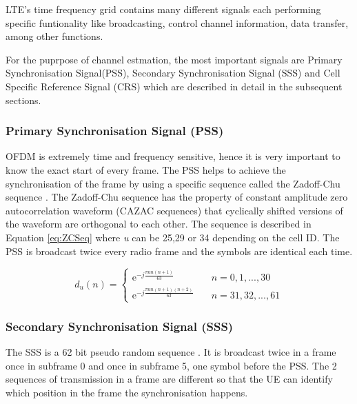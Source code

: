 LTE's time frequency grid contains many different signals each performing specific funtionality like broadcasting, control channel information, data transfer, among other functions.

For the puprpose of channel estmation, the most important signals are Primary Synchronisation Signal(PSS), Secondary Synchronisation Signal (SSS) and Cell Specific Reference Signal (CRS) which are described in detail in the subsequent sections.

\subsubsection {Primary Synchronisation Signal (PSS)} \label{sssec:PSS}
        OFDM is extremely time and frequency sensitive, hence it is very important to know the exact start of every frame. The PSS helps to achieve the synchronisation of the frame by using a specific sequence called the Zadoff-Chu sequence \cite{3gpp36211}.
        The Zadoff-Chu sequence has the property of constant amplitude zero autocorrelation waveform (CAZAC sequences) that cyclically shifted versions of the waveform are orthogonal to each other. The sequence is described in Equation \ref{eq:ZCSeq} where {\em u}  can be 25,29 or 34 depending on the cell ID.
        The PSS is broadcast twice every radio frame and the symbols are identical each time.

\begin{equation} \label{eq:ZCSeq}
        d_u(n) =
        \begin{cases}
            \mathrm{e}^{-j\frac{\pi un(n+1)}{63}}       & \quad n=0,1,...,30\\
            \mathrm{e}^{-j\frac{\pi un(n+1)(n+2)}{63}} & \quad n=31,32,...,61
        \end{cases}
\end{equation}

\subsubsection{Secondary Synchronisation Signal (SSS)} \label{sssec:SSS}
        The SSS is a 62 bit pseudo random sequence \cite{3gpp36211}. It is broadcast twice in a frame once in subframe 0 and once in subframe 5, one symbol before the PSS. The 2 sequences of transmission in a frame are different so that the UE can identify which position in the frame the synchronisation happens.

